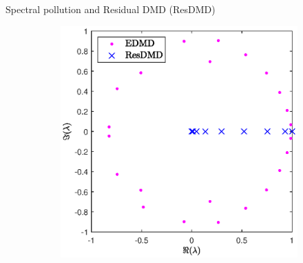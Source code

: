 \documentclass{beamer}
\begin{document}
\begin{frame}{Spectral pollution and Residual DMD (ResDMD)}
\begin{figure}[h]
{\begin{subfigure}{.49\linewidth}
    \includegraphics[width=\linewidth]{../code/figures/gauss_map/presentation_resdmd.eps}
  \end{subfigure}}\\
\end{figure}
\end{frame}
\end{document}
